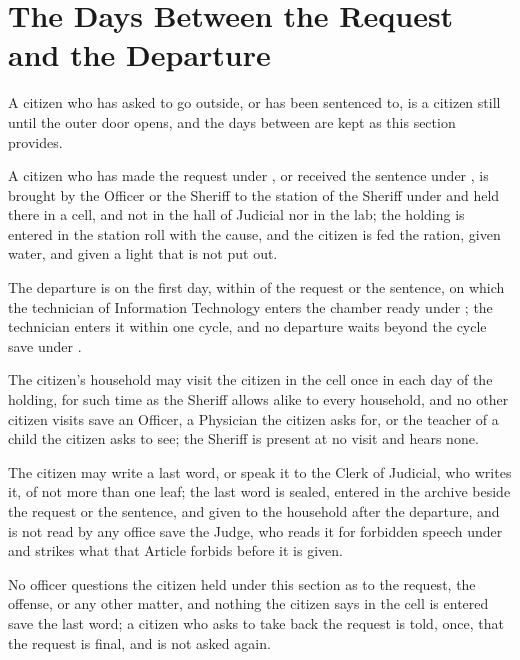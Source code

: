 \section{The Days Between the Request and the Departure}
\label{sec:cleaning:days-between-the-request-and-the-departure}

A citizen who has asked to go outside, or has been sentenced to, is a citizen still until the outer door opens, and the days between are kept as this section provides.

\begin{clauses}
\item A citizen who has made the request under , or received the sentence under , is brought by the Officer or the Sheriff to the station of the Sheriff under  and held there in a cell, and not in the hall of Judicial nor in the lab; the holding is entered in the station roll with the cause, and the citizen is fed the ration, given water, and given a light that is not put out.
\item The departure is on the first day, within  of the request or the sentence, on which the technician of Information Technology enters the chamber ready under ; the technician enters it within one cycle, and no departure waits beyond the cycle save under .
\item The citizen's household may visit the citizen in the cell once in each day of the holding, for such time as the Sheriff allows alike to every household, and no other citizen visits save an Officer, a Physician the citizen asks for, or the teacher of a child the citizen asks to see; the Sheriff is present at no visit and hears none.
\item The citizen may write a last word, or speak it to the Clerk of Judicial, who writes it, of not more than one leaf; the last word is sealed, entered in the archive beside the request or the sentence, and given to the household after the departure, and is not read by any office save the Judge, who reads it for forbidden speech under  and strikes what that Article forbids before it is given.
\item No officer questions the citizen held under this section as to the request, the offense, or any other matter, and nothing the citizen says in the cell is entered save the last word; a citizen who asks to take back the request is told, once, that the request is final, and is not asked again.

\end{clauses}
